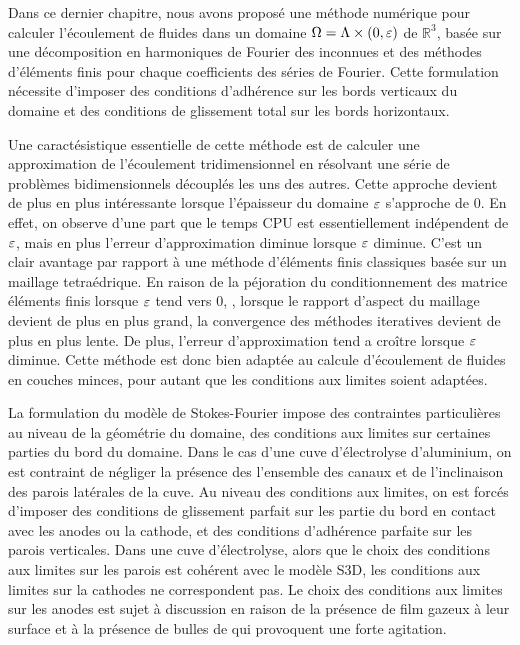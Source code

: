 Dans ce dernier chapitre, nous avons proposé une méthode numérique
pour calculer l'écoulement de fluides dans un domaine
$\Omega = \Lambda\times(0,\varepsilon)$ de $\mathbb R^3$, basée sur une
décomposition en harmoniques de Fourier des inconnues et des
méthodes d'éléments finis pour chaque coefficients des séries de
Fourier. Cette formulation nécessite d'imposer des conditions
d'adhérence sur les bords verticaux du domaine et des conditions de
glissement total sur les bords horizontaux.

Une caractésistique essentielle de cette méthode est de calculer une
approximation de l'écoulement tridimensionnel en résolvant une
série de problèmes bidimensionnels découplés les uns des autres. Cette
approche devient de plus en plus intéressante lorsque l'épaisseur du
domaine $\varepsilon$ s'approche de 0. En effet, on observe d'une part
que le temps CPU est essentiellement indépendent de $\varepsilon$, mais
en plus l'erreur d'approximation diminue lorsque $\varepsilon$
diminue. C'est un clair avantage par rapport à une méthode
d'éléments finis classiques basée sur un maillage tetraédrique. En
raison de la péjoration du conditionnement des matrice éléments
finis lorsque $\varepsilon$ tend vers 0, \ie, lorsque le rapport
d'aspect du maillage devient de plus en plus grand, la convergence des
méthodes iteratives devient de plus en plus lente. De plus, l'erreur
d'approximation tend a croître lorsque $\varepsilon$ diminue.
Cette méthode est donc bien adaptée au calcule d'écoulement de
fluides en couches minces, pour autant que les conditions aux limites
soient adaptées.

La formulation du modèle de Stokes-Fourier impose des contraintes
particulières au niveau de la géométrie du domaine, des conditions
aux limites sur certaines parties du bord du domaine. Dans le cas
d'une cuve d'électrolyse d'aluminium, on est contraint de négliger la
présence des l'ensemble des canaux et de l'inclinaison des parois
latérales de la cuve. Au niveau des conditions aux limites, on est
forcés d'imposer des conditions de glissement parfait sur les partie
du bord en contact avec les anodes ou la cathode, et des conditions
d'adhérence parfaite sur les parois verticales. Dans une cuve
d'électrolyse, alors que le choix des conditions aux limites sur les
parois est cohérent avec le modèle S3D, les conditions aux limites sur
la cathodes ne correspondent pas. Le choix des conditions aux limites
sur les anodes est sujet à discussion en raison de la présence de
film gazeux à leur surface et à la présence de bulles de 
qui provoquent une forte agitation.

